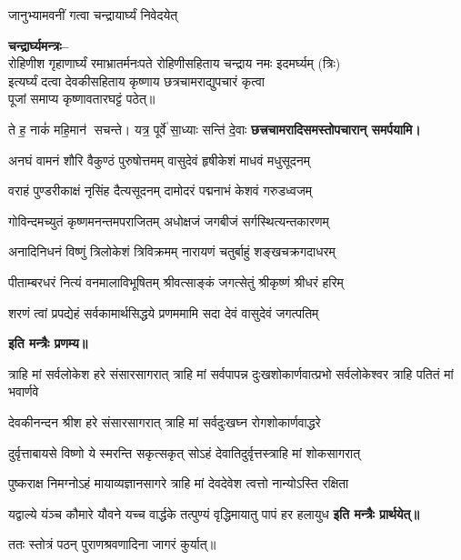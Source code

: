\begin{center}
{जानुभ्यामवनीं गत्वा चन्द्रायार्घ्यं निवेदयेत्}

\textbf{चन्द्रार्घ्यमन्त्रः–}\\
{रोहिणीश गृहाणार्घ्यं रमाभ्रातर्मनःपते}
रोहिणीसहिताय चन्द्राय नमः इदमर्घ्यम् (त्रिः)\\

इत्यर्घ्यं दत्वा देवकीसहिताय कृष्णाय छत्रचामराद्युपचारं कृत्वा\\पूजां समाप्य कृष्णावतारघट्टं पठेत्॥

{ते ह॒ नाकं॑ महि॒मान॑ सचन्ते। यत्र॒ पूर्वे॑ सा॒ध्याः सन्ति॑ दे॒वाः}
\textbf{\devAya{} छत्त्रचामरादिसमस्तोपचारान् समर्पयामि।}
\medskip

\twolineshloka
{अनघं वामनं शौरि वैकुण्ठं पुरुषोत्तमम्}
{वासुदेवं हृषीकेशं माधवं मधुसूदनम्}

\twolineshloka
{वराहं पुण्डरीकाक्षं नृसिंह दैत्यसूदनम्}
{दामोदरं पद्मनाभं केशवं गरुडध्वजम्}

\twolineshloka
{गोविन्दमच्युतं कृष्णमनन्तमपराजितम्}
{अधोक्षजं जगबीजं सर्गस्थित्यन्तकारणम्}

\twolineshloka
{अनादिनिधनं विष्णुं त्रिलोकेशं त्रिविक्रमम्}
{नारायणं चतुर्बाहुं शङ्खचक्रगदाधरम्}

\twolineshloka
{पीताम्बरधरं नित्यं वनमालाविभूषितम्}
{श्रीवत्साङ्कं जगत्सेतुं श्रीकृष्णं श्रीधरं हरिम्}

\twolineshloka
{शरणं त्वां प्रपद्येहं सर्वकामार्थसिद्धये}
{प्रणममामि सदा देवं वासुदेवं जगत्पतिम्}

\textbf{इति मन्त्रैः प्रणम्य॥}


\resetShloka
\threelineshloka
{त्राहि मां सर्वलोकेश हरे संसारसागरात्}
{त्राहि मां सर्वपापन्न दुःखशोकार्णवात्प्रभो}
{सर्वलोकेश्वर त्राहि पतितं मां भवार्णवे}

\twolineshloka
{देवकीनन्दन श्रीश हरे संसारसागरात्}
{त्राहि मां सर्वदुःखघ्न रोगशोकार्णवाद्धरे}

\twolineshloka
{दुर्वृत्ताबायसे विष्णो ये स्मरन्ति सकृत्सकृत्}
{सोऽहं देवातिदुर्वृत्तस्त्राहि मां शोकसागरात्}

\twolineshloka
{पुष्कराक्ष निमग्नोऽहं मायाव्यज्ञानसागरे}
{त्राहि मां देवदेवेश त्वत्तो नान्योऽस्ति रक्षिता}

\twolineshloka
{यद्वाल्ये यंञ्च कौमारे यौवने यच्च वार्द्धके}
{तत्पुण्यं वृद्धिमायातु पापं हर हलायुध}
\textbf{इति मन्त्रैः प्रार्थयेत्॥}

ततः स्तोत्रं पठन् पुराणश्रवणादिना जागरं कुर्यात्॥


\end{center}
